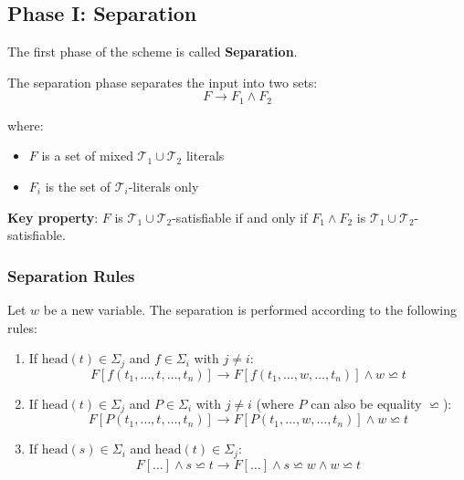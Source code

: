 \documentclass[11pt,a4paper]{article}
\theoremstyle{definition}
\theoremstyle{plain}
\theoremstyle{remark}
\begin{document}
\begin{center}
\end{center} 

\subsection{Phase I: Separation}

The first phase of the scheme is called \textbf{Separation}.

\begin{tcolorbox}[colback=blue!5!white,colframe=blue!75!black,title=\textbf{Separation Phase}]
The separation phase separates the input into two sets:
\[
F \longrightarrow F_1 \wedge F_2
\]

where:
\begin{itemize}
    \item $F$ is a set of mixed $\mathcal{T}_1 \cup \mathcal{T}_2$ literals
    \item $F_i$ is the set of $\mathcal{T}_i$-literals only
\end{itemize}

\textbf{Key property}: $F$ is $\mathcal{T}_1 \cup \mathcal{T}_2$-satisfiable if and only if $F_1 \wedge F_2$ is $\mathcal{T}_1 \cup \mathcal{T}_2$-satisfiable.
\end{tcolorbox}

\subsubsection{Separation Rules}

Let $w$ be a new variable. The separation is performed according to the following rules:

\begin{enumerate}
    \item If $\text{head}(t) \in \Sigma_j$ and $f \in \Sigma_i$ with $j \neq i$:
    \[
    F[f(t_1, \ldots, t, \ldots, t_n)] \longrightarrow F[f(t_1, \ldots, w, \ldots, t_n)] \wedge w \backsimeq t
    \]

    \item If $\text{head}(t) \in \Sigma_j$ and $P \in \Sigma_i$ with $j \neq i$ (where $P$ can also be equality $\backsimeq$):
    \[
    F[P(t_1, \ldots, t, \ldots, t_n)] \longrightarrow F[P(t_1, \ldots, w, \ldots, t_n)] \wedge w \backsimeq t
    \]

    \item If $\text{head}(s) \in \Sigma_i$ and $\text{head}(t) \in \Sigma_j$:
    \[
    F[\ldots] \wedge s \backsimeq t \longrightarrow F[\ldots] \wedge s \backsimeq w \wedge w \backsimeq t
    \]
\end{enumerate}
\end{document}
